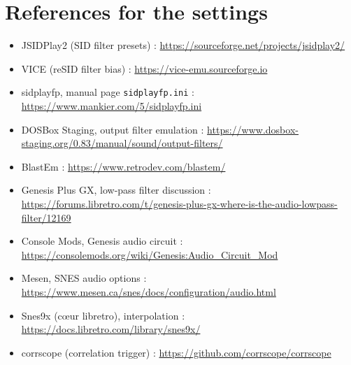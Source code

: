 \section*{References for the settings}
\begin{itemize}
  \item JSIDPlay2 (SID filter presets) : \url{https://sourceforge.net/projects/jsidplay2/}
  \item VICE (reSID filter bias) : \url{https://vice-emu.sourceforge.io}
  \item sidplayfp, manual page \texttt{sidplayfp.ini} : \url{https://www.mankier.com/5/sidplayfp.ini}
  \item DOSBox Staging, output filter emulation : \url{https://www.dosbox-staging.org/0.83/manual/sound/output-filters/}
  \item BlastEm : \url{https://www.retrodev.com/blastem/}
  \item Genesis Plus GX, low-pass filter discussion : \url{https://forums.libretro.com/t/genesis-plus-gx-where-is-the-audio-lowpass-filter/12169}
  \item Console Mods, Genesis audio circuit : \url{https://consolemods.org/wiki/Genesis:Audio_Circuit_Mod}
  \item Mesen, SNES audio options : \url{https://www.mesen.ca/snes/docs/configuration/audio.html}
  \item Snes9x (cœur libretro), interpolation : \url{https://docs.libretro.com/library/snes9x/}
  \item corrscope (correlation trigger) : \url{https://github.com/corrscope/corrscope}
\end{itemize}
